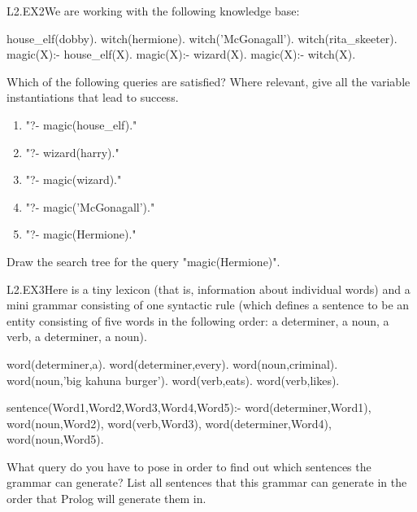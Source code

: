 \begin{LPNexercise}{L2.EX2}We are working with the following knowledge base:
\begin{LPNcodedisplay}
house_elf(dobby).
witch(hermione).
witch('McGonagall').
witch(rita_skeeter).
magic(X):- house_elf(X).
magic(X):- wizard(X).
magic(X):- witch(X).
\end{LPNcodedisplay}


Which of the following queries are satisfied? Where relevant, give all
the variable instantiations that lead to success.
\begin{enumerate}
\item{}"?- magic(house\_elf)."
\item{}"?- wizard(harry)."
\item{}"?- magic(wizard)."
\item{}"?- magic('McGonagall')."
\item{}"?- magic(Hermione)."
\end{enumerate}
Draw the search tree for the query "magic(Hermione)".
\end{LPNexercise}


\begin{LPNexercise}{L2.EX3}Here is a tiny lexicon
(that is, information about individual words) and a mini grammar
consisting of one syntactic rule (which defines a sentence to be an
entity consisting of five words in the following order: a determiner,
a noun, a verb, a determiner, a noun).

\begin{LPNcodedisplay}
word(determiner,a).
word(determiner,every).
word(noun,criminal).
word(noun,'big kahuna burger').
word(verb,eats).
word(verb,likes).

sentence(Word1,Word2,Word3,Word4,Word5):-
   word(determiner,Word1),
   word(noun,Word2),
   word(verb,Word3),
   word(determiner,Word4),
   word(noun,Word5).
\end{LPNcodedisplay}
What query do you have to pose in order to find out which sentences
the grammar can generate?  List all sentences that this grammar can
generate in the order that Prolog will generate them in.
\end{LPNexercise}



